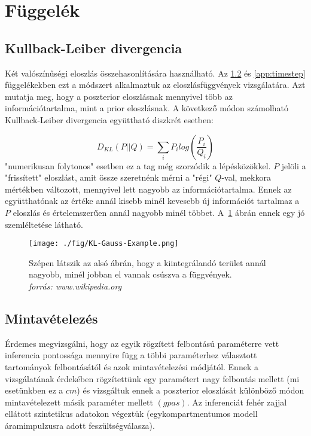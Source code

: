 \section{Függelék}
\subsection{Kullback-Leiber divergencia}\label{app:KL}
Két valószínűségi eloszlás összehasonlítására használható. Az \ref{app:sampling} és \ref{app:timestep} függelékekben ezt a módszert alkalmaztuk az eloszlásfüggvények vizsgálatára. Azt mutatja meg, hogy a poszterior eloszlásnak mennyivel több az információtartalma, mint a prior eloszlásnak. A következő módon számolható Kullback-Leiber divergencia együttható diszkrét esetben:

\begin{equation}\label{eq:kl}
D_{KL}(P||Q) = \sum_i P_ilog\left(\frac{P_i}{Q_i}\right)
\end{equation}
"numerikusan folytonos" esetben ez a tag még szorzódik a lépésközökkel. $P$ jelöli a "frissített" eloszlást, amit össze szeretnénk mérni a "régi" $Q$-val, mekkora mértékben változott, mennyivel lett nagyobb az információtartalma. Ennek az együtthatónak az értéke annál kisebb minél kevesebb új információt tartalmaz a $P$ eloszlás és értelemszerűen annál nagyobb minél többet. A~\ref{fig:KL} ábrán ennek egy jó szemléltetése látható.

\begin{figure}[!htb]
	\centering
	\texttt{[image: ./fig/KL-Gauss-Example.png]}
	\caption[Kullback-Leiber divergencia]{Szépen látszik az alsó ábrán, hogy a kiintegrálandó terület annál nagyobb, minél jobban el vannak csúszva a függvények. \\
	\textit{forrás: www.wikipedia.org} }
	\label{fig:KL}
\end{figure}



\FloatBarrier
\subsection{Mintavételezés}\label{app:sampling}
Érdemes megvizsgálni, hogy az egyik rögzített felbontású paraméterre vett inferencia pontossága mennyire függ a többi paraméterhez választott tartományok felbontásától és azok mintavételezési módjától. Ennek a vizsgálatának érdekében rögzítettünk egy paramétert nagy felbontás mellett (mi esetünkben ez a $cm$) és vizsgáltuk ennek a poszterior eloszlását különböző módon mintavételezett másik paraméter mellett $(gpas)$. Az inferenciát fehér zajjal ellátott szintetikus adatokon végeztük (egykompartmentumos modell áramimpulzusra adott feszültségválasza).

